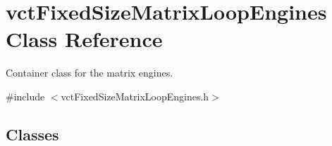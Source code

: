 \hypertarget{classvct_fixed_size_matrix_loop_engines}{\section{vct\-Fixed\-Size\-Matrix\-Loop\-Engines Class Reference}
\label{classvct_fixed_size_matrix_loop_engines}
}


Container class for the matrix engines.  




{\ttfamily \#include $<$vct\-Fixed\-Size\-Matrix\-Loop\-Engines.\-h$>$}

\subsection*{Classes}
